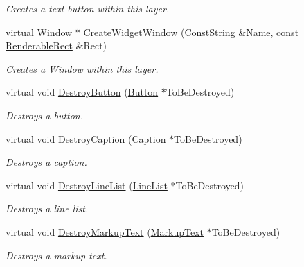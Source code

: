 \begin{DoxyCompactItemize}
\begin{DoxyCompactList}\small\item\em Creates a text button within this layer. \item\end{DoxyCompactList}\item 
virtual \hyperlink{classphys_1_1UI_1_1Window}{Window} $\ast$ \hyperlink{classphys_1_1UI_1_1Layer_a2efe08dca3cb4300a68c7f4d8e5296a0}{CreateWidgetWindow} (\hyperlink{namespacephys_a5ce5049f8b4bf88d6413c47b504ebb31}{ConstString} \&Name, const \hyperlink{structphys_1_1UI_1_1RenderableRect}{RenderableRect} \&Rect)
\begin{DoxyCompactList}\small\item\em Creates a \hyperlink{classphys_1_1UI_1_1Window}{Window} within this layer. \item\end{DoxyCompactList}\item 
virtual void \hyperlink{classphys_1_1UI_1_1Layer_ac011ff1dd631287500f5b2aff43726e3}{DestroyButton} (\hyperlink{classphys_1_1UI_1_1Button}{Button} $\ast$ToBeDestroyed)
\begin{DoxyCompactList}\small\item\em Destroys a button. \item\end{DoxyCompactList}\item 
virtual void \hyperlink{classphys_1_1UI_1_1Layer_a62195d1732e1d200f0b847331ef6d3b0}{DestroyCaption} (\hyperlink{classphys_1_1UI_1_1Caption}{Caption} $\ast$ToBeDestroyed)
\begin{DoxyCompactList}\small\item\em Destroys a caption. \item\end{DoxyCompactList}\item 
virtual void \hyperlink{classphys_1_1UI_1_1Layer_aa0854e22fefd9378b0cdf7a217a3aeeb}{DestroyLineList} (\hyperlink{classphys_1_1UI_1_1LineList}{LineList} $\ast$ToBeDestroyed)
\begin{DoxyCompactList}\small\item\em Destroys a line list. \item\end{DoxyCompactList}\item 
virtual void \hyperlink{classphys_1_1UI_1_1Layer_a30a9991d13023b2bb941dab0667f91e6}{DestroyMarkupText} (\hyperlink{classphys_1_1UI_1_1MarkupText}{MarkupText} $\ast$ToBeDestroyed)
\begin{DoxyCompactList}\small\item\em Destroys a markup text. \item\end{DoxyCompactList}\item 

\end{DoxyCompactItemize}
